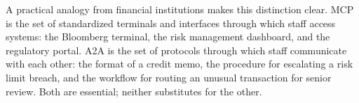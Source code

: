 \documentclass{article}
\begin{document}
A practical analogy from financial institutions makes this distinction clear. MCP is the set of standardized terminals and interfaces through which staff access systems: the Bloomberg terminal, the risk management dashboard, and the regulatory portal. A2A is the set of protocols through which staff communicate with each other: the format of a credit memo, the procedure for escalating a risk limit breach, and the workflow for routing an unusual transaction for senior review. Both are essential; neither substitutes for the other.




\end{document}
